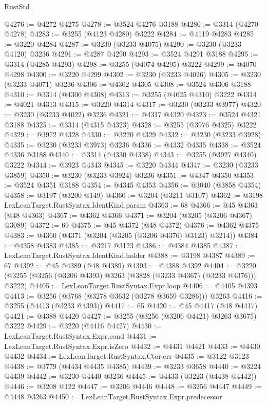 \begin{lexlean}{RustStd}
\begin{coremodule}
@4276 := @4272 @4275
@4278 := @3524 @4276 @3188
@4280 := @3314 (@4270 @4278)
@4283 := @3255 (@4123 @4280) @3222
@4284 := @4119 @4283
@4285 := @3220 @4284
@4287 := @3230 (@3233 @4075)
@4290 := @3230 (@3233 @4120) @3236
@4291 := @4287 @4290
@4293 := @3524 @4291 @3188
@4295 := @3314 (@4285 @4293)
@4298 := @3255 (@4074 @4295) @3222
@4299 := @4070 @4298
@4300 := @3220 @4299
@4302 := @3230 (@3233 @4026)
@4305 := @3230 (@3233 @4071) @3236
@4306 := @4302 @4305
@4308 := @3524 @4306 @3188
@4310 := @3314 (@4300 @4308)
@4313 := @3255 (@4025 @4310) @3222
@4314 := @4021 @4313
@4315 := @3220 @4314
@4317 := @3230 (@3233 @3977)
@4320 := @3230 (@3233 @4022) @3236
@4321 := @4317 @4320
@4323 := @3524 @4321 @3188
@4325 := @3314 (@4315 @4323)
@4328 := @3255 (@3976 @4325) @3222
@4329 := @3972 @4328
@4330 := @3220 @4329
@4332 := @3230 (@3233 @3928)
@4335 := @3230 (@3233 @3973) @3236
@4336 := @4332 @4335
@4338 := @3524 @4336 @3188
@4340 := @3314 (@4330 @4338)
@4343 := @3255 (@3927 @4340) @3222
@4344 := @3923 @4343
@4345 := @3220 @4344
@4347 := @3230 (@3233 @3859)
@4350 := @3230 (@3233 @3924) @3236
@4351 := @4347 @4350
@4353 := @3524 @4351 @3188
@4354 := @4345 @4353
@4356 := @3040 (@3858 @4354)
@4358 := @3197 (@3200 @149)
@4360 := @3204 (@3211 @3107)
@4362 := @3198 LexLeanTarget.RustSyntax.IdentKind.param
@4363 := 68
@4366 := @45 @4363 (@48 @4363)
@4367 := @4362 @4366
@4371 := @3204 (@3205 (@3206 @4367) @3089)
@4372 := 69
@4375 := @45 @4372 (@48 @4372)
@4376 := @4362 @4375
@4383 := @4360 (@4371 (@3204 (@3205 (@3206 @4376) @3123) @3214))
@4384 := @4358 @4383
@4385 := @3217 @3123
@4386 := @4384 @4385
@4387 := LexLeanTarget.RustSyntax.IdentKind.holder
@4388 := @3198 @4387
@4389 := 67
@4392 := @45 @4389 (@48 @4389)
@4393 := @4388 @4392
@4404 := @3220 (@3255 (@3256 (@3206 @4393) @3263 (@3828 (@3233 @4367) (@3233 @4376))) @3222)
@4405 := LexLeanTarget.RustSyntax.Expr.loop
@4406 := @4405 @4393
@4413 := @3256 (@3768 (@3278 @3632 (@3278 @3659 @3286))) @3263
@4416 := @3255 (@4413 (@3233 @4393))
@4417 := 65
@4420 := @45 @4417 (@48 @4417)
@4421 := @4388 @4420
@4427 := @3255 (@3256 (@3206 @4421) @3263 @3675) @3222
@4429 := @3220 (@4416 @4427)
@4430 := LexLeanTarget.RustSyntax.Expr.cond
@4431 := LexLeanTarget.RustSyntax.Expr.isZero
@4432 := @4431 @4421
@4433 := @4430 @4432
@4434 := LexLeanTarget.RustSyntax.Ctor.err
@4435 := @3122 @3123
@4438 := @3779 (@4434 @4435 @4385)
@4439 := @3233 @3658
@4440 := @3224 @4439
@4442 := @3230 @4440 @3236
@4445 := @4433 (@3223 (@4438 @4442))
@4446 := @3208 @122
@4447 := @3206 @4446
@4448 := @3256 @4447
@4449 := @4448 @3263
@4450 := LexLeanTarget.RustSyntax.Expr.predecessor

\end{coremodule}
\end{lexlean}
